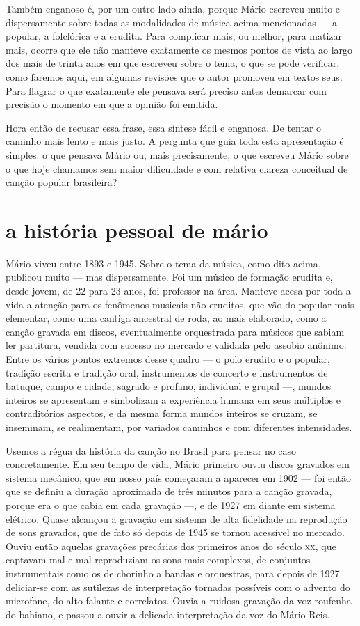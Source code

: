 Também enganoso é, por um outro lado ainda, porque Mário escreveu muito
e dispersamente sobre todas as modalidades de música acima mencionadas
--- a popular, a folclórica e a erudita. Para complicar mais,
ou melhor, para matizar mais, ocorre que ele não manteve exatamente os
mesmos pontos de vista ao largo dos mais de trinta anos em que escreveu
sobre o tema, o que se pode verificar, como faremos aqui, em algumas
revisões que o autor promoveu em textos seus. Para flagrar o que
exatamente ele pensava será preciso antes demarcar com precisão o
momento em que a opinião foi emitida.

Hora então de recusar essa frase, essa síntese fácil e enganosa. De
tentar o caminho mais lento e mais justo. A pergunta que guia toda esta
apresentação é simples: o que pensava Mário ou, mais precisamente, o que
escreveu Mário sobre o que hoje chamamos sem maior dificuldade e com
relativa clareza conceitual de canção popular brasileira?

\section{a história pessoal de mário}

Mário viveu entre 1893 e 1945. Sobre o tema da música, como dito
acima, publicou muito --- mas dispersamente. Foi um músico de formação erudita
e, desde jovem, de 22 para 23 anos, foi professor na área. 
Manteve acesa por toda a vida a atenção para os fenômenos musicais
não-eruditos, que vão do popular mais elementar, como uma cantiga
ancestral de roda, ao mais elaborado, como a canção gravada em discos,
eventualmente orquestrada para músicos que sabiam ler partitura, vendida
com sucesso no mercado e validada pelo assobio anônimo. Entre os vários
pontos extremos desse quadro --- o polo erudito e o popular, tradição
escrita e tradição oral, instrumentos de concerto e instrumentos de
batuque, campo e cidade, sagrado e profano, individual e grupal ---,
mundos inteiros se apresentam e simbolizam a experiência humana em seus
múltiplos e contraditórios aspectos, e da mesma forma mundos inteiros se
cruzam, se inseminam, se realimentam, por variados caminhos e com
diferentes intensidades.

Usemos a régua da história da canção no Brasil para pensar no caso
concretamente. Em seu tempo de vida, Mário primeiro ouviu discos
gravados em sistema mecânico, que em nosso país começaram a aparecer em
1902 --- foi então que se definiu a duração aproximada de três minutos para
a canção gravada, porque era o que cabia em cada gravação ---, e de 1927
em diante em sistema elétrico. Quase alcançou a gravação em sistema de
alta fidelidade na reprodução de sons gravados, que de fato só depois de
1945 se tornou acessível no mercado. Ouviu então aquelas gravações
precárias dos primeiros anos do século \textsc{xx}, que captavam mal e mal
reproduziam os sons mais complexos, de conjuntos instrumentais como os
de chorinho a bandas e orquestras, para depois de 1927 deliciar-se com as
sutilezas de interpretação tornadas possíveis com o advento do
microfone, do alto-falante e correlatos. Ouvia a ruidosa gravação da voz
roufenha do bahiano, e passou a ouvir a delicada interpretação da voz do
Mário Reis.

